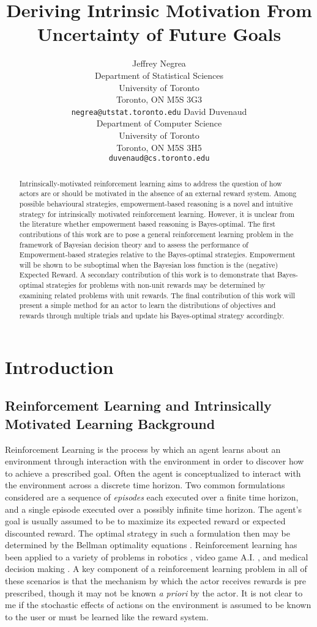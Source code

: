 \documentclass{article}
\title{Deriving Intrinsic Motivation From Uncertainty of Future Goals}
\author{
 Jeffrey Negrea\\
 Department of Statistical Sciences\\
 University of Toronto\\
 Toronto, ON M5S 3G3\\
 \texttt{negrea@utstat.toronto.edu}
 \And
 David Duvenaud\\
 Department of Computer Science\\
 University of Toronto\\
 Toronto, ON M5S 3H5\\
 \texttt{duvenaud@cs.toronto.edu}
}
\begin{document}
\maketitle

\begin{abstract}
Intrinsically-motivated reinforcement learning aims to address the question of how actors are or should be motivated in the absence of an external reward system. 
Among possible behavioural strategies, empowerment-based reasoning is a novel and intuitive strategy for intrinsically motivated reinforcement learning. 
However, it is unclear from the literature whether empowerment based reasoning is Bayes-optimal.
The first contributions of this work are to pose a general reinforcement learning problem in the framework of Bayesian decision theory and to assess the performance of Empowerment-based strategies relative to the Bayes-optimal strategies. 
Empowerment will be shown to be suboptimal when the Bayesian loss function is the (negative) Expected Reward. 
A secondary contribution of this work is to demonstrate that Bayes-optimal strategies  for problems with non-unit rewards may be determined by examining related problems with unit rewards.  The final contribution of this work will present a simple method for an actor to learn the distributions of objectives and rewards through multiple trials and update his Bayes-optimal strategy accordingly. 
\end{abstract}

\section{Introduction}
\subsection{Reinforcement Learning and Intrinsically Motivated Learning Background}
Reinforcement Learning is the process by which an agent learns about an environment through interaction with the environment in order to discover how to achieve a prescribed goal. Often the agent is conceptualized to interact with the environment across a discrete time horizon. Two common formulations considered are a sequence of \textit{episodes} each executed over a finite time horizon, and a single episode executed over a possibly infinite time horizon. The agent's goal is usually assumed to be to maximize its expected reward or expected discounted reward. The optimal strategy in such a formulation then may be determined by the Bellman optimality equations \cite{sutton1998reinforcement}. Reinforcement learning has been applied to a variety of problems in robotics \cite{mcallister2016data,finn2016deep,christiano2016transfer}, video game A.I. \cite{mnih2015human}, and medical decision making \cite{krishnan2016structured}. A key component of a reinforcement learning problem in all of these scenarios is that the mechanism by which the actor receives rewards is pre prescribed, though it may not be known \textit{a priori} by the actor. \color{red} It is not clear to me if the stochastic effects of actions on the environment is assumed to be known to the user or must be learned like the reward system.\color{black}
\end{document}
